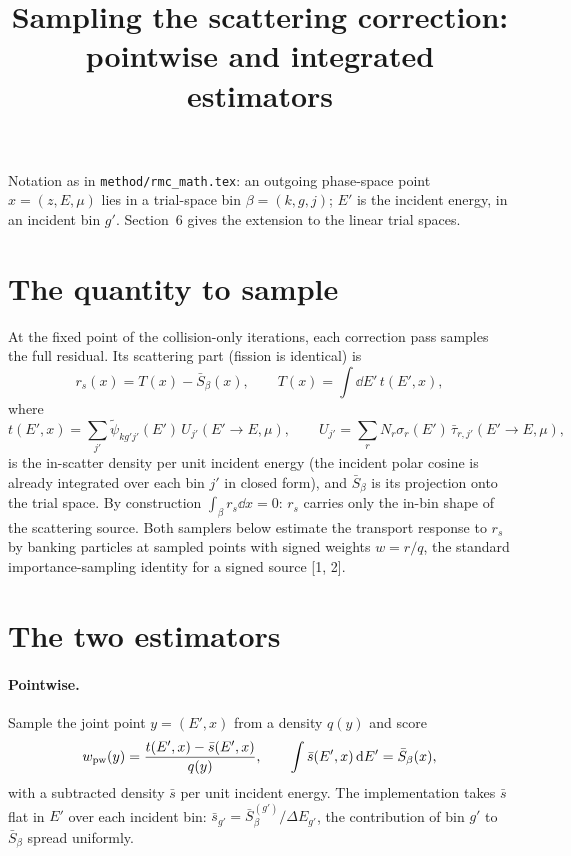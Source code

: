 \documentclass[11pt]{article}
\title{Sampling the scattering correction: pointwise and integrated estimators}
\date{}
\newcommand{\tpsi}{\tilde\psi}
\newcommand{\Sbar}{\bar S}
\begin{document}
\maketitle

\noindent Notation as in \texttt{method/rmc\_math.tex}: an outgoing phase-space point
$x=(z,E,\mu)$ lies in a trial-space bin $\beta=(k,g,j)$; $E'$ is the incident energy,
in an incident bin $g'$. Section~6 gives the extension to the linear trial spaces.

\section{The quantity to sample}

At the fixed point of the collision-only iterations, each correction pass samples the
full residual. Its scattering part (fission is identical) is
\begin{equation}
  r_s(x) = T(x) - \Sbar_\beta(x),\qquad
  T(x) = \int \dd E'\, t(E',x),
  \label{eq:rs}
\end{equation}
where
\begin{equation}
  t(E',x) = \sum_{j'} \tpsi_{kg'j'}(E')\, U_{j'}(E'\to E,\mu),\qquad
  U_{j'} = \sum_r N_r\sigma_r(E')\,\bar\tau_{r,j'}(E'\to E,\mu),
\end{equation}
is the in-scatter density per unit incident energy (the incident polar cosine is
already integrated over each bin $j'$ in closed form), and $\Sbar_\beta$ is its
projection onto the trial space. By construction $\int_\beta r_s\dd x = 0$: $r_s$
carries only the in-bin shape of the scattering source. Both samplers below estimate
the transport response to $r_s$ by banking particles at sampled points with signed
weights $w = r/q$, the standard importance-sampling identity for a signed source [1, 2].

\section{The two estimators}

\paragraph{Pointwise.} Sample the joint point $y=(E',x)$ from a density $q(y)$ and score
\begin{equation}
  w_{\rm pw}(y) = \frac{t(E',x) - \bar s(E',x)}{q(y)},
  \qquad \int \bar s(E',x)\dd E' = \Sbar_\beta(x),
  \label{eq:pointwise}
\end{equation}
with a subtracted density $\bar s$ per unit incident energy. The implementation takes
$\bar s$ flat in $E'$ over each incident bin:
$\bar s_{g'} = \Sbar^{(g')}_\beta/\Delta E_{g'}$, the contribution of bin $g'$ to
$\Sbar_\beta$ spread uniformly.
\end{document}
